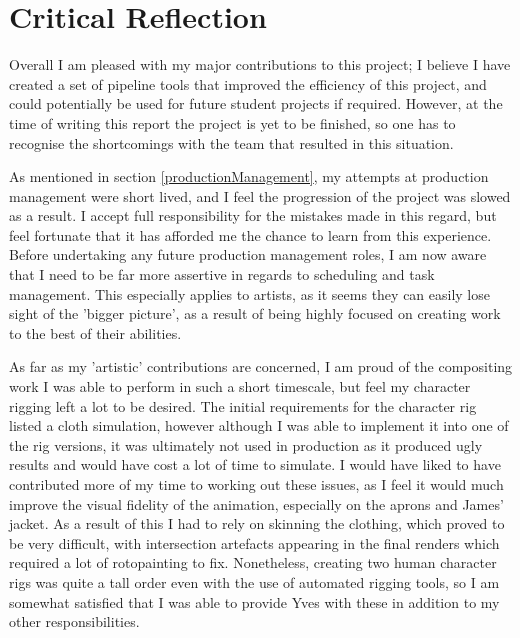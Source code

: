 \documentclass[11pt]{article}
\begin{document}
\section{Critical Reflection}

Overall I am pleased with my major contributions to this project; I believe I have created a set of pipeline tools that improved the efficiency of this project, and could potentially be used for future student projects if required. However, at the time of writing this report the project is yet to be finished, so one has to recognise the shortcomings with the team that resulted in this situation.

As mentioned in section \ref{productionManagement}, my attempts at production management were short lived, and I feel the progression of the project was slowed as a result. I accept full responsibility for the mistakes made in this regard, but feel fortunate that it has afforded me the chance to learn from this experience. Before undertaking any future production management roles, I am now aware that I need to be far more assertive in regards to scheduling and task management. This especially applies to artists, as it seems they can easily lose sight of the 'bigger picture', as a result of being highly focused on creating work to the best of their abilities.

As far as my 'artistic' contributions are concerned, I am proud of the compositing work I was able to perform in such a short timescale, but feel my character rigging left a lot to be desired. The initial requirements for the character rig listed a cloth simulation, however although I was able to implement it into one of the rig versions, it was ultimately not used in production as it produced ugly results and would have cost a lot of time to simulate. I would have liked to have contributed more of my time to working out these issues, as I feel it would much improve the visual fidelity of the animation, especially on the aprons and James' jacket. As a result of this I had to rely on skinning the clothing, which proved to be very difficult, with intersection artefacts appearing in the final renders which required a lot of rotopainting to fix. Nonetheless, creating two human character rigs was quite a tall order even with the use of automated rigging tools, so I am somewhat satisfied that I was able to provide Yves with these in addition to my other responsibilities.
\end{document}
